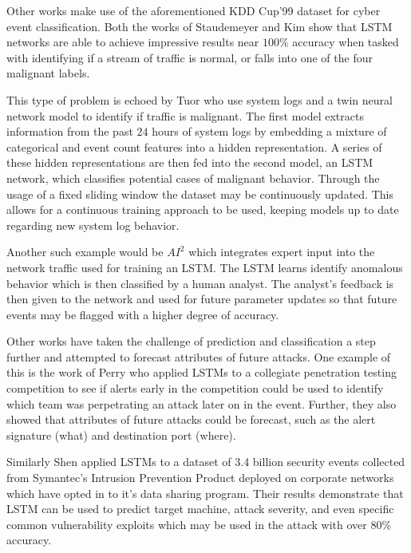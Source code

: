 Other works make use of the aforementioned KDD Cup'99 dataset for cyber event classification. Both the works of Staudemeyer \etal \cite{Staudemeyer} and Kim \etal \cite{Kim} show that LSTM networks are able to achieve impressive results near $100\%$ accuracy when tasked with identifying if a stream of traffic is normal, or falls into one of the four malignant labels. 

This type of problem is echoed by Tuor \etal \cite{Tuor} who use system logs and a twin neural network model to identify if traffic is malignant. The first model extracts information from the past $24$ hours of system logs by embedding a mixture of categorical and event count features into a hidden representation. A series of these hidden representations are then fed into the second model, an LSTM network, which classifies potential cases of malignant behavior. Through the usage of a fixed sliding window the dataset may be continuously updated. This allows for a continuous training approach to be used, keeping models up to date regarding new system log behavior. 

Another such example would be $AI^2$ \cite{Veeramachaneni2016} which integrates expert input into the network traffic used for training an LSTM. The LSTM learns identify anomalous behavior which is then classified by a human analyst. The analyst's feedback is then given to the network and used for future parameter updates so that future events may be flagged with a higher degree of accuracy.

Other works have taken the challenge of prediction and classification a step further and attempted to forecast attributes of future attacks. One example of this is the work of Perry \etal \cite{us} who applied LSTMs to a collegiate penetration testing competition to see if alerts early in the competition could be used to identify which team was perpetrating an attack later on in the event. Further, they also showed that attributes of future attacks could be forecast, such as the alert signature (what) and destination port (where). 

Similarly Shen \etal \cite{Shen2018} applied LSTMs to a dataset of 3.4 billion security events collected from Symantec's Intrusion Prevention Product deployed on corporate networks which have opted in to it's data sharing program. Their results demonstrate that LSTM can be used to predict target machine, attack severity, and even specific common vulnerability exploits which may be used in the attack with over $80\%$ accuracy. 

